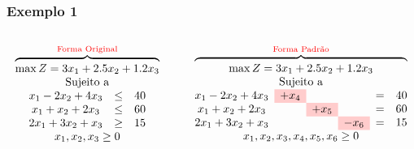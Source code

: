 \begin{frame}
	\frametitle{Exemplo 1}
	\begin{columns}
		{
		\begin{column}{0.4\textwidth}
			\centering
			\begin{equation*}
				\overset{\text{\color{red}Forma Original}}
				{
					\overbrace{
								\begin{matrix}
									\max Z = 3x_1 + 2.5x_2 + 1.2x_3 \\
									\text{Sujeito a} \\
									\begin{matrix}
										x_1-2x_2+4x_3 & \le & 40 \\
										x_1+x_2+ 2x_3 & \le & 60 \\
										2x_1+3x_2+x_3 & \ge & 15 \\
									\end{matrix} \\
									x_1, x_2, x_3 \ge 0 \\
								\end{matrix}
							  }
				}
			\end{equation*}
		\end{column}
		}
		{
		\begin{column}{0.6\textwidth}
			\centering
			\begin{equation*}
				\overset{\text{\color{red}Forma Padrão}}
				{
					\overbrace{
								\begin{matrix}
									\max Z = 3x_1 + 2.5x_2 + 1.2x_3 \\
									\text{Sujeito a} \\
									\begin{matrix}
										x_1-2x_2+4x_3 & \cellcolor{red!20}+x_4 &      &      & = & 40 \\
										x_1+x_2+2x_3  &      & \cellcolor{red!20}+x_5 &      & = & 60 \\
										2x_1+3x_2+x_3 &      &      & \cellcolor{red!20}-x_6 & = & 15 \\
									\end{matrix} \\
									x_1, x_2, x_3, x_4, x_5, x_6 \ge 0 \\
								\end{matrix}
							  }
				}
			\end{equation*}
		\end{column}
		}
	\end{columns}
\end{frame}

